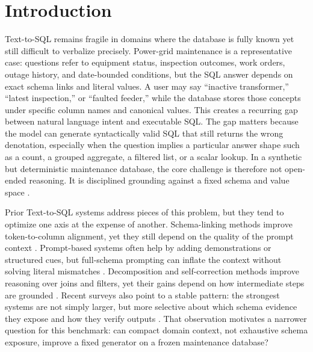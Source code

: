 \documentclass[applsci,article,submit,moreauthors]{Definitions/mdpi}
\begin{document}
\section{Introduction}\label{introduction}

Text-to-SQL remains fragile in domains where the database is fully known yet still difficult to verbalize precisely. Power-grid maintenance is a representative case: questions refer to equipment status, inspection outcomes, work orders, outage history, and date-bounded conditions, but the SQL answer depends on exact schema links and literal values. A user may say ``inactive transformer,'' ``latest inspection,'' or ``faulted feeder,'' while the database stores those concepts under specific column names and canonical values. This creates a recurring gap between natural language intent and executable SQL. The gap matters because the model can generate syntactically valid SQL that still returns the wrong denotation, especially when the question implies a particular answer shape such as a count, a grouped aggregate, a filtered list, or a scalar lookup. In a synthetic but deterministic maintenance database, the core challenge is therefore not open-ended reasoning. It is disciplined grounding against a fixed schema and value space \cite{zhong2020semantic,lei2020reexamining,liu2022semantic,quamar2022natural}.

Prior Text-to-SQL systems address pieces of this problem, but they tend to optimize one axis at the expense of another. Schema-linking methods improve token-to-column alignment, yet they still depend on the quality of the prompt context \cite{lei2020reexamining,gan2021robustness,liu2021awakening}. Prompt-based systems often help by adding demonstrations or structured cues, but full-schema prompting can inflate the context without solving literal mismatches \cite{chang2023prompt,nan2023enhancing,sun2023sqlprompt}. Decomposition and self-correction methods improve reasoning over joins and filters, yet their gains depend on how intermediate steps are grounded \cite{pourreza2023dinsql,wang2023macsql,talaei2024chess}. Recent surveys also point to a stable pattern: the strongest systems are not simply larger, but more selective about which schema evidence they expose and how they verify outputs \cite{liu2024survey,katsogiannismeimarakis2023survey,huang2024survey}. That observation motivates a narrower question for this benchmark: can compact domain context, not exhaustive schema exposure, improve a fixed generator on a frozen maintenance database?
\end{document}
